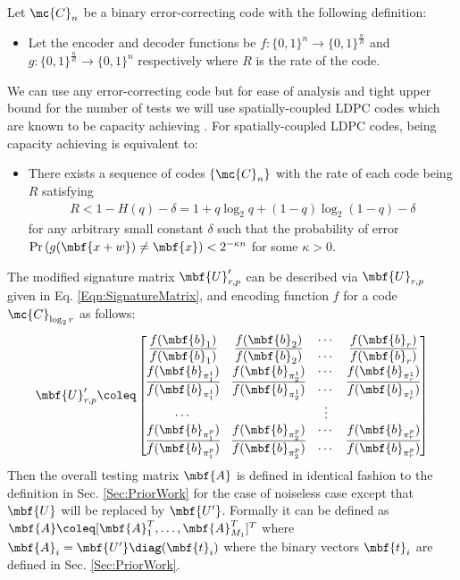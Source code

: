 \documentclass[conference,twocolumn]{IEEEtran}
\begin{document}
Let $\mc{C}_n$ be a binary error-correcting code with the following definition:
\begin{itemize}
\item Let the encoder and decoder functions be $f:\{0,1\}^{n}\rightarrow \{0,1\}^{\frac{n}{R}}$ and $g:\{0,1\}^{\frac{n}{R}}\rightarrow \{0,1\}^{n}$ respectively where $R$ is the rate of the code.
\end{itemize}
We can use any error-correcting code but for ease of analysis and tight upper bound for the number of tests we will use spatially-coupled LDPC codes which are known to be capacity achieving \cite{kumar2014threshold,kudekar2013spatially}. For spatially-coupled LDPC codes, being capacity achieving is equivalent to: 
\begin{itemize}
\item There exists a sequence of codes $\{\mc{C}_n\}$ with the rate of each code being $R$ satisfying 
\begin{align}
\label{Eqn:ProbErrorCoding}
R<1-H(q)-\delta=1+q\log_2 q+(1-q)\log_2(1-q)-\delta
\end{align}
for any arbitrary small constant $\delta$ such that the probability of error $\text{Pr}\left(g(\mbf{x+w})\neq \mbf{x}\right)<2^{-\kappa n}$ for some $\kappa >0$.
\end{itemize} 
The modified signature matrix $\mbf{U}'_{r,p}$ can be described via $\mbf{U}_{r, p}$ given in Eq. \eqref{Eqn:SignatureMatrix}, and encoding function $f$ for a code $\mc{C}_{\log_2 r}$ as follows:
 \begin{align}
\label{Eqn:SignatureMatrixModified}
\mbf{U}_{r,p}'\coleq\begin{bmatrix}
f(\mbf{b}_1)  & f(\mbf{b}_2) &\cdots & f(\mbf{b}_r) \\
\overline{f(\mbf{b}_1)} & \overline{f(\mbf{b}_2)} & \cdots & \overline{f(\mbf{b}_r)}\\
f(\mbf{b}_{\pi^{1}_{1}}) & f(\mbf{b}_{\pi^{1}_{2}}) & \cdots & f(\mbf{b}_{\pi^{1}_{r}})\\
\overline{f(\mbf{b}_{\pi^{1}_{1}})} & \overline{f(\mbf{b}_{\pi^{1}_{2}})} & \cdots & \overline{f(\mbf{b}_{\pi^{1}_{r}})}\\
\cdots &  &\vdots \\
f(\mbf{b}_{\pi^{p}_{1}}) & f(\mbf{b}_{\pi^{p}_{2}}) & \cdots & f(\mbf{b}_{\pi^{p}_{r}})\\
\overline{f(\mbf{b}_{\pi^{p}_{1}})} & \overline{f(\mbf{b}_{\pi^{p}_{2}})} & \cdots & \overline{f(\mbf{b}_{\pi^{p}_{r}})}\\
\end{bmatrix}
\end{align}  
Then the overall testing matrix $\mbf{A}$ is defined in identical fashion to the definition in Sec. \ref{Sec:PriorWork} for the case of noiseless case except that $\mbf{U}$ will be replaced by $\mbf{U'}$. Formally it can be defined as $\mbf{A}\coleq [\mbf{A}_{1}^{T},\ldots,\mbf{A}_{M_{1}}^{T}]^T$ where $\mbf{A}_{i}=\mbf{U'} \diag (\mbf{t}_i)$ where the binary vectors $\mbf{t}_i$ are defined in Sec. \ref{Sec:PriorWork}. 
\end{document}
